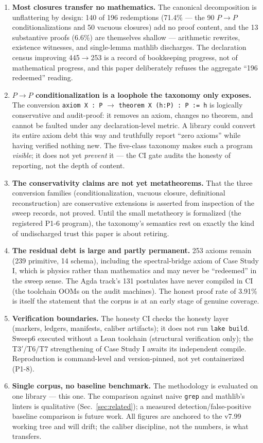 \begin{enumerate}
\item \textbf{Most closures transfer no mathematics.} The
canonical decomposition is unflattering by design: 140 of 196
redemptions (71.4\% --- the 90 $P\!\to\!P$ conditionalizations and
50 vacuous closures) add no proof content, and the 13 substantive
proofs (6.6\%) are themselves shallow --- arithmetic rewrites,
existence witnesses, and single-lemma mathlib discharges. The
declaration census improving 445$\to$253 is a record of
bookkeeping progress, not of mathematical progress, and this
paper deliberately refuses the aggregate ``196 redeemed''
reading.
\item \textbf{$P\!\to\!P$ conditionalization is a loophole the
taxonomy only exposes.} The conversion \texttt{axiom X : P} $\to$
\texttt{theorem X (h:P) : P := h} is logically conservative and
audit-proof: it removes an axiom, changes no theorem, and cannot
be faulted under any declaration-level metric. A library could
convert its entire axiom debt this way and truthfully report
``zero axioms'' while having verified nothing new. The five-class
taxonomy makes such a program \emph{visible}; it does not yet
\emph{prevent} it --- the CI gate audits the honesty of reporting,
not the depth of content.
\item \textbf{The conservativity claims are not yet metatheorems.}
That the three conversion families (conditionalization, vacuous
closure, definitional reconstruction) are conservative extensions
is asserted from inspection of the sweep records, not proved.
Until the small metatheory is formalized (the registered P1-6
program), the taxonomy's semantics rest on exactly the kind of
undischarged trust this paper is about retiring.
\item \textbf{The residual debt is large and partly permanent.}
253 axioms remain (239 primitive, 14 schema), including the
spectral-bridge axiom of Case Study I, which is physics rather
than mathematics and may never be ``redeemed'' in the sweep sense.
The Agda track's 131 postulates have never compiled in CI (the
toolchain OOMs on the audit machines). The honest proof rate of
3.91\% is itself the statement that the corpus is at an early
stage of genuine coverage.
\item \textbf{Verification boundaries.} The honesty CI checks the
honesty layer (markers, ledgers, manifests, caliber artifacts);
it does not run \texttt{lake build}. Sweep6 executed without a
Lean toolchain (structural verification only); the T3$'$/T6/T7
strengthening of Case Study I awaits its independent compile.
Reproduction is command-level and version-pinned, not yet
containerized (P1-8).
\item \textbf{Single corpus, no baseline benchmark.} The
methodology is evaluated on one library --- this one. The
comparison against naive \texttt{grep} and mathlib's linters is
qualitative (Sec.~\ref{sec:related}); a measured
detection/false-positive baseline comparison is future work. All
figures are anchored to the v7.99 working tree and will drift;
the caliber discipline, not the numbers, is what transfers.
\end{enumerate}

